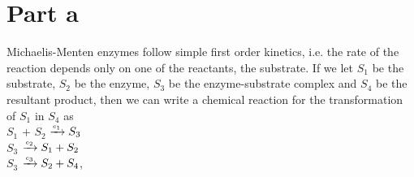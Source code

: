 \section{Part a}
Michaelis-Menten enzymes follow simple first order kinetics, i.e. the rate of the reaction depends only on  one of the reactants, the substrate. If we let $S_{1}$ be the substrate, $S_{2}$ be the enzyme, $S_{3}$ be the enzyme-substrate complex and $S_{4}$ be the resultant product, then we can write a chemical reaction for the transformation of $S_{1}$ in  $S_{4}$ as\\

$S_{1}$ + $S_{2}$  $\xrightarrow{\mbox{\tiny{$c_{1}$}}} S_{3}$\\


$S_{3}$ $\xrightarrow{\mbox{\tiny{$c_{2}$}}} S_{1} + S_{2}$\\


$S_{3}$ $\xrightarrow{\mbox{\tiny{$c_{3}$}}} S_{2} + S_{4}$,\\

